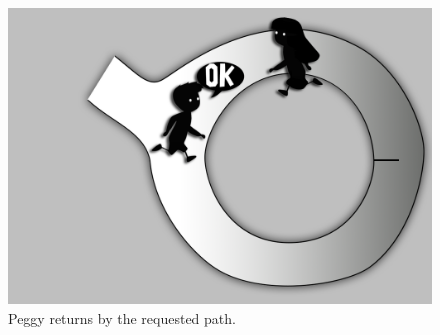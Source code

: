 \begin{otherlanguage}{english}
\begin{figure}[!htb]
	\includegraphics[width=\linewidth]{gfx/graficoJL_ZKP_3}
	\caption*{Peggy returns by the requested path.\\ }\label{fig:3}
	\endminipage
\end{figure}


\end{otherlanguage}

\endgroup			

\vfill
